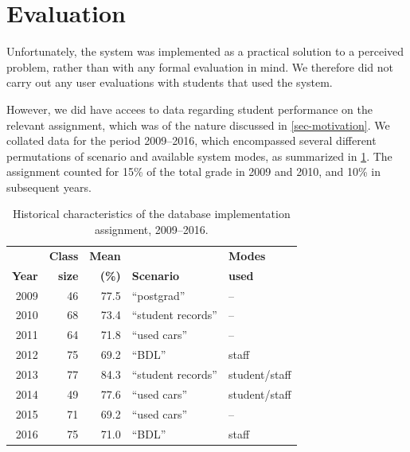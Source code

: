 \documentclass[sigconf, authordraft, capitalise]{acmart}
\begin{document}
\section{Evaluation}
\label{sec-evaluation}

Unfortunately, the system was implemented as a practical solution to a perceived problem, rather than with any formal evaluation in mind. We therefore did not carry out any user evaluations with students that used the system.

However, we did have accees to data regarding student performance on the relevant assignment, which was of the nature discussed in \cref{sec-motivation}. We collated data for the period 2009--2016, which encompassed several different permutations of scenario and available system modes, as summarized in \cref{tab-data}. The assignment counted for 15\% of the total grade in 2009 and 2010, and 10\% in subsequent years.


\begin{table}
    \begin{tabular}{rrrll}
        \toprule
                        &   \textbf{Class}  &   \textbf{Mean}   &                       &   \textbf{Modes}  \\
        \textbf{Year}   &   \textbf{size}   &   \textbf{(\%)}   &   \textbf{Scenario}   &   \textbf{used}\\
        \midrule
        2009    &   46  &   77.5    &   ``postgrad''        &   --  \\
        2010    &   68  &   73.4    &   ``student records'' &   --  \\
        2011    &   64  &   71.8    &   ``used cars''       &   --  \\
        \midrule
        2012    &   75  &   69.2    &   ``BDL''             &   staff   \\
        2013    &   77  &   84.3    &   ``student records'' &   student/staff \\
        \midrule
        2014    &   49  &   77.6    &   ``used cars''       &   student/staff \\
        2015    &   71  &   69.2    &   ``used cars''       &   --  \\
        2016    &   75  &   71.0    &   ``BDL''             &   staff   \\
        \bottomrule
    \end{tabular}
    \caption{Historical characteristics of the database implementation assignment, 2009--2016.}
    \label{tab-data}
\end{table}
\end{document}
